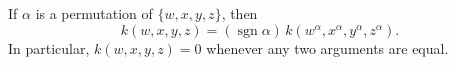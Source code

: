 If $\alpha$ is a permutation of $\{w, x, y, z\}$, then
$$k(w, x, y, z) = (\operatorname{sgn} \alpha) \, k(w^\alpha, x^\alpha, y^\alpha, z^\alpha).$$
In particular, $k(w, x, y, z) = 0$ whenever any two arguments are equal.
